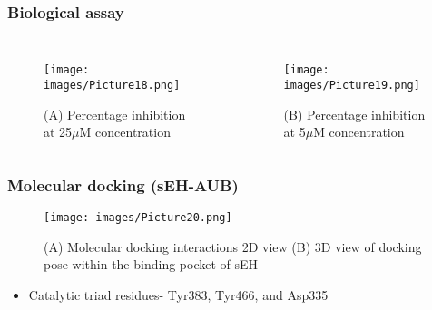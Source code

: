 \documentclass{beamer}
\begin{document}
\begin{frame}
\frametitle{\textbf{Biological assay}}
\begin{columns}[c] 
\begin{figure}
\texttt{[image: images/Picture18.png]}
\caption{\tiny(A) Percentage inhibition at 25$\mu$M concentration}
\end{figure}
\begin{figure}
\texttt{[image: images/Picture19.png]}
\caption{\tiny(B) Percentage inhibition at 5$\mu$M concentration}
\end{figure}
\end{columns}
\end{frame}

\begin{frame}
\frametitle{\textbf{Molecular docking (sEH-AUB)}}
\begin{figure}
\texttt{[image: images/Picture20.png]}
\caption{(A) Molecular docking interactions 2D view (B) 3D view of docking pose within the binding pocket of sEH}
\end{figure}
\begin{itemize}
\item Catalytic triad residues- Tyr383, Tyr466, and Asp335
\end{itemize}
\end{frame}
\end{document}
